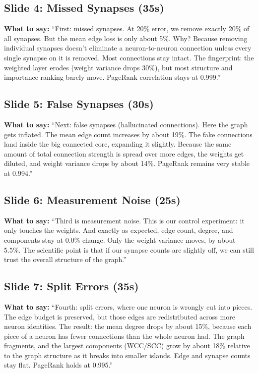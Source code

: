 \documentclass[11pt]{article}
\begin{document}
\subsection*{Slide 4: Missed Synapses (35s)}
\textbf{What to say:} 
``First: missed synapses. At 20\% error, we remove exactly 20\% of all synapses. But the mean edge loss is only about 5\%. Why? Because removing individual synapses doesn't eliminate a neuron-to-neuron connection unless every single synapse on it is removed. Most connections stay intact. The fingerprint: the weighted layer erodes (weight variance drops 30\%), but most structure and importance ranking barely move. PageRank correlation stays at 0.999.''

\subsection*{Slide 5: False Synapses (30s)}
\textbf{What to say:} 
``Next: false synapses (hallucinated connections). Here the graph gets inflated. The mean edge count increases by about 19\%. The fake connections land inside the big connected core, expanding it slightly. Because the same amount of total connection strength is spread over more edges, the weights get diluted, and weight variance drops by about 14\%. PageRank remains very stable at 0.994.''

\subsection*{Slide 6: Measurement Noise (25s)}
\textbf{What to say:} 
``Third is measurement noise. This is our control experiment: it only touches the weights. And exactly as expected, edge count, degree, and components stay at 0.0\% change. Only the weight variance moves, by about 5.5\%. The scientific point is that if our synapse counts are slightly off, we can still trust the overall structure of the graph.''

\subsection*{Slide 7: Split Errors (35s)}
\textbf{What to say:} 
``Fourth: split errors, where one neuron is wrongly cut into pieces. The edge budget is preserved, but those edges are redistributed across more neuron identities. The result: the mean degree drops by about 15\%, because each piece of a neuron has fewer connections than the whole neuron had. The graph fragments, and the largest components (WCC/SCC) grow by about 18\% relative to the graph structure as it breaks into smaller islands. Edge and synapse counts stay flat. PageRank holds at 0.995.''
\end{document}
